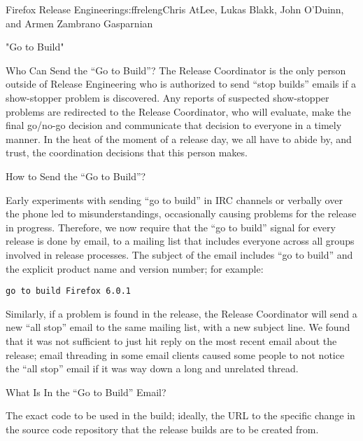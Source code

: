 \begin{aosachapter}{Firefox Release Engineering}{s:ffreleng}{Chris AtLee, Lukas Blakk, John O'Duinn, and Armen Zambrano Gasparnian}
\begin{aosasect1}{"Go to Build"}
\begin{aosasect2}{Who Can Send the ``Go to Build''?}
The Release Coordinator is the only person outside of Release
Engineering who is authorized to send ``stop builds'' emails if a
show-stopper problem is discovered. Any reports of
suspected show-stopper problems are redirected to the Release
Coordinator, who will evaluate, make the final go/no-go decision and
communicate that decision to everyone in a timely manner. In the heat 
of the moment of a release day, we all have to abide by, and trust, the 
coordination decisions that this person makes. 

\end{aosasect2}

\begin{aosasect2}{How to Send the ``Go to Build''?}

Early experiments with sending ``go to build'' in IRC channels or
verbally over the phone led to misunderstandings,
occasionally causing problems for the release in progress. Therefore,
we now require that the ``go to build'' signal for every release is
done by email, to a mailing list that includes everyone across all
groups involved in release processes. The subject of the email
includes ``go to build'' and the explicit product name and version
number; for example:

\begin{verbatim}
go to build Firefox 6.0.1
\end{verbatim}

Similarly, if a problem is found in the release, the Release
Coordinator will send a new ``all stop'' email to the same mailing list,
with a new subject line. We found that it was not sufficient to just hit reply
on the most recent email about the release; email threading in some
email clients caused some people to not notice the ``all stop'' email if
it was way down a long and unrelated thread.

\end{aosasect2}

\begin{aosasect2}{What Is In the ``Go to Build'' Email?}

\begin{aosaenumerate}

\item The exact code to be used in the build; ideally, the URL to the
specific change in the source code repository that the release builds are
to be created from.

  \begin{aosaenumerate2}


\end{aosaenumerate2}
\end{aosaenumerate}
\end{aosasect2}
\end{aosasect1}
\end{aosachapter}

